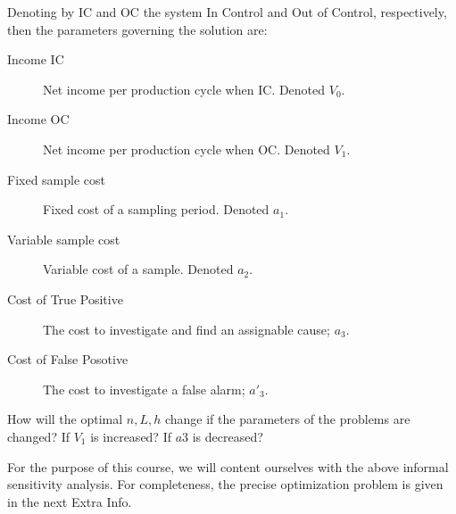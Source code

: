 Denoting by IC and OC the system In Control and Out of Control, respectively, then the parameters governing the solution are:
\begin{description}
\item[Income IC] Net income per production cycle when IC. Denoted $V_0$.
\item[Income OC] Net income per production cycle when OC. Denoted $V_1$.
\item[Fixed sample cost] Fixed cost of a sampling period. Denoted $a_1$. 
\item[Variable sample cost] Variable cost of a sample. Denoted $a_2$.
\item[Cost of True Positive] The cost to investigate and find an assignable cause; $a_3$.
\item[Cost of False Posotive] The cost to investigate a false alarm; $a'_3$.
\end{description}


\begin{think}
How will the optimal $n,L,h$ change if the parameters of the problems are changed?
If $V_1$ is increased?
If $a3$ is decreased?
\end{think}

For the purpose of this course, we will content ourselves with the above informal sensitivity analysis.
For completeness, the precise optimization problem is given in the next Extra Info.

